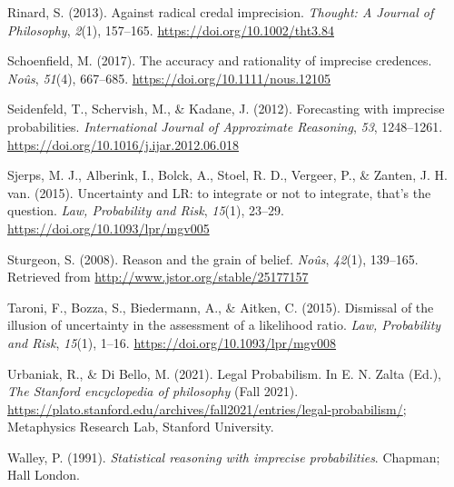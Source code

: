 \documentclass[
  10pt,
  dvipsnames,enabledeprecatedfontcommands]{scrartcl}
\newlength{\cslhangindent}
\newenvironment{CSLReferences}[2] %
 {\begin{list}{}{%
  \setlength{\itemindent}{0pt}
  \setlength{\leftmargin}{0pt}
  \setlength{\parsep}{0pt}
  \ifodd #1
   \setlength{\leftmargin}{\cslhangindent}
   \setlength{\itemindent}{-1\cslhangindent}
  \fi
  \setlength{\itemsep}{#2\baselineskip}}}
 {\end{list}}
\begin{document}
\begin{CSLReferences}{1}{0}
Rinard, S. (2013). Against radical credal imprecision. \emph{Thought: A
Journal of Philosophy}, \emph{2}(1), 157--165.
\url{https://doi.org/10.1002/tht3.84}

Schoenfield, M. (2017). The accuracy and rationality of imprecise
credences. \emph{Noûs}, \emph{51}(4), 667--685.
\url{https://doi.org/10.1111/nous.12105}

Seidenfeld, T., Schervish, M., \& Kadane, J. (2012). Forecasting with
imprecise probabilities. \emph{International Journal of Approximate
Reasoning}, \emph{53}, 1248--1261.
\url{https://doi.org/10.1016/j.ijar.2012.06.018}

Sjerps, M. J., Alberink, I., Bolck, A., Stoel, R. D., Vergeer, P., \&
Zanten, J. H. van. (2015). {Uncertainty and LR: to integrate or not to
integrate, that's the question}. \emph{Law, Probability and Risk},
\emph{15}(1), 23--29. \url{https://doi.org/10.1093/lpr/mgv005}

Sturgeon, S. (2008). Reason and the grain of belief. \emph{No{û}s},
\emph{42}(1), 139--165. Retrieved from
\url{http://www.jstor.org/stable/25177157}

Taroni, F., Bozza, S., Biedermann, A., \& Aitken, C. (2015). {Dismissal
of the illusion of uncertainty in the assessment of a likelihood ratio}.
\emph{Law, Probability and Risk}, \emph{15}(1), 1--16.
\url{https://doi.org/10.1093/lpr/mgv008}

Urbaniak, R., \& Di Bello, M. (2021). {Legal Probabilism}. In E. N.
Zalta (Ed.), \emph{The {Stanford} encyclopedia of philosophy} (Fall
2021).
\url{https://plato.stanford.edu/archives/fall2021/entries/legal-probabilism/};
Metaphysics Research Lab, Stanford University.

Walley, P. (1991). \emph{Statistical reasoning with imprecise
probabilities}. Chapman; Hall London.

\end{CSLReferences}
\end{document}
